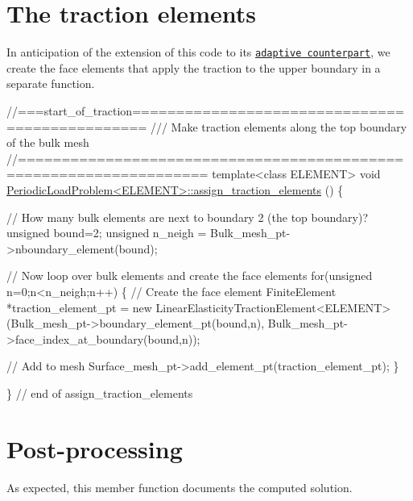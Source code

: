  

\hypertarget{index_traction_elements}{}\section{The traction elements}\label{index_traction_elements}
In anticipation of the extension of this code to its \href{../../refineable_periodic_load/html/index.html}{\tt adaptive counterpart}, we create the face elements that apply the traction to the upper boundary in a separate function.


\begin{DoxyCodeInclude}
\textcolor{comment}{//===start\_of\_traction===============================================}
\textcolor{comment}{/// Make traction elements along the top boundary of the bulk mesh}
\textcolor{comment}{}\textcolor{comment}{//===================================================================}
\textcolor{keyword}{template}<\textcolor{keyword}{class} ELEMENT>
\textcolor{keywordtype}{void} \hyperlink{classPeriodicLoadProblem_ad850863c61c0055e230e6319d67905e2}{PeriodicLoadProblem<ELEMENT>::assign\_traction\_elements}
      ()
\{

 \textcolor{comment}{// How many bulk elements are next to boundary 2 (the top boundary)?}
 \textcolor{keywordtype}{unsigned} bound=2;
 \textcolor{keywordtype}{unsigned} n\_neigh = Bulk\_mesh\_pt->nboundary\_element(bound); 
 
 \textcolor{comment}{// Now loop over bulk elements and create the face elements}
 \textcolor{keywordflow}{for}(\textcolor{keywordtype}{unsigned} n=0;n<n\_neigh;n++)
  \{
   \textcolor{comment}{// Create the face element}
   FiniteElement *traction\_element\_pt 
    = \textcolor{keyword}{new} LinearElasticityTractionElement<ELEMENT>
    (Bulk\_mesh\_pt->boundary\_element\_pt(bound,n),
     Bulk\_mesh\_pt->face\_index\_at\_boundary(bound,n));
 
   \textcolor{comment}{// Add to mesh}
   Surface\_mesh\_pt->add\_element\_pt(traction\_element\_pt);
  \}
 
\} \textcolor{comment}{// end of assign\_traction\_elements}

\end{DoxyCodeInclude}




 

\hypertarget{index_doc}{}\section{Post-\/processing}\label{index_doc}
As expected, this member function documents the computed solution.


